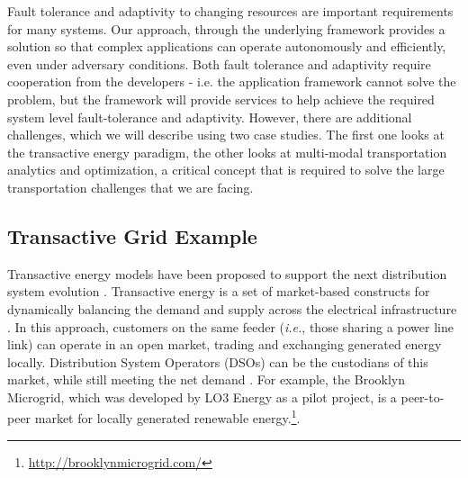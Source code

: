 \documentclass[12pt,letterpaper]{article}
\begin{document}
Fault tolerance and adaptivity to changing resources are important requirements for many systems. Our approach, through the underlying framework provides a solution so that complex applications can operate autonomously and efficiently, even under adversary conditions. Both fault tolerance and adaptivity require cooperation from the developers - i.e. the application framework cannot solve the problem, but the framework will provide services to help achieve the required system level fault-tolerance and adaptivity.  However, there are additional challenges, which we will describe using two case studies. The first one looks at the transactive energy paradigm, the other looks at multi-modal transportation analytics and optimization, a critical concept that is required to solve the large transportation challenges that we are facing. 

\subsection{Transactive Grid Example}

Transactive energy models have
been proposed to support the next distribution system evolution
\cite{kok2016society,cox2013structured,melton2013gridwise}. Transactive
energy is a set of market-based constructs for dynamically balancing
the demand and supply across the electrical infrastructure
\cite{melton2013gridwise}. In this approach, customers on the same
feeder (\emph{i.e.}, those sharing a power line link) can operate in an
open market, trading and exchanging generated energy
locally. Distribution System Operators (DSOs) can be the custodians of
this market, while still meeting the net demand \cite{7462854}. For
example, the Brooklyn Microgrid, which was developed by LO3 Energy as
a pilot project, is a peer-to-peer market for locally generated
renewable energy.\footnote{\url{http://brooklynmicrogrid.com/}}.
\end{document}
